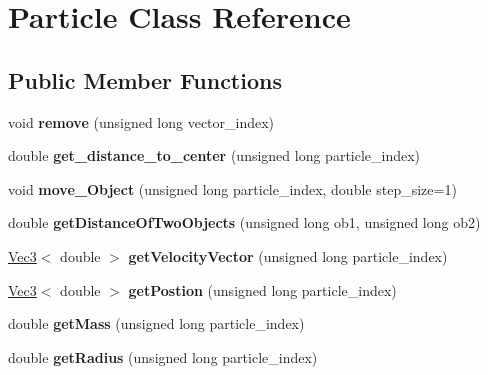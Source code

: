 \hypertarget{classParticle}{}\section{Particle Class Reference}
\label{classParticle}
\subsection*{Public Member Functions}
\begin{DoxyCompactItemize}
\item 
\hypertarget{classParticle_a1b9b969dd9c1d2a8147640bde85913ca}{}void {\bfseries remove} (unsigned long vector\+\_\+index)\label{classParticle_a1b9b969dd9c1d2a8147640bde85913ca}

\item 
\hypertarget{classParticle_abf747e26491e7a7af1792aa7d0d69aef}{}double {\bfseries get\+\_\+distance\+\_\+to\+\_\+center} (unsigned long particle\+\_\+index)\label{classParticle_abf747e26491e7a7af1792aa7d0d69aef}

\item 
\hypertarget{classParticle_a40734ec81f97cb43f533245f3644c474}{}void {\bfseries move\+\_\+\+Object} (unsigned long particle\+\_\+index, double step\+\_\+size=1)\label{classParticle_a40734ec81f97cb43f533245f3644c474}

\item 
\hypertarget{classParticle_aeea985651cf29b2fdd368fec991961a8}{}double {\bfseries get\+Distance\+Of\+Two\+Objects} (unsigned long ob1, unsigned long ob2)\label{classParticle_aeea985651cf29b2fdd368fec991961a8}

\item 
\hypertarget{classParticle_a2e0c0e885353fa1c916baf31366c2ed3}{}\hyperlink{classVec3}{Vec3}$<$ double $>$ {\bfseries get\+Velocity\+Vector} (unsigned long particle\+\_\+index)\label{classParticle_a2e0c0e885353fa1c916baf31366c2ed3}

\item 
\hypertarget{classParticle_a2071bda8f42ce83d30f267145f32ceb6}{}\hyperlink{classVec3}{Vec3}$<$ double $>$ {\bfseries get\+Postion} (unsigned long particle\+\_\+index)\label{classParticle_a2071bda8f42ce83d30f267145f32ceb6}

\item 
\hypertarget{classParticle_abfd6556526b15b5bee3384ae7baec48b}{}double {\bfseries get\+Mass} (unsigned long particle\+\_\+index)\label{classParticle_abfd6556526b15b5bee3384ae7baec48b}

\item 
\hypertarget{classParticle_a699d893583b4fabeffd48c0a509bd50e}{}double {\bfseries get\+Radius} (unsigned long particle\+\_\+index)\label{classParticle_a699d893583b4fabeffd48c0a509bd50e}


\end{DoxyCompactItemize}

